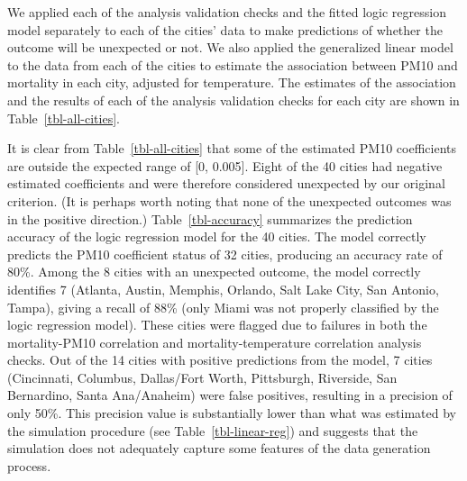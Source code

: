 \documentclass[
  12pt,
]{interact}
\begin{document}
We applied each of the analysis validation checks and the fitted logic
regression model separately to each of the cities' data to make
predictions of whether the outcome will be unexpected or not. We also
applied the generalized linear model to the data from each of the cities
to estimate the association between PM10 and mortality in each city,
adjusted for temperature. The estimates of the association and the
results of each of the analysis validation checks for each city are
shown in Table~\ref{tbl-all-cities}.

\begin{table}

\caption{\label{tbl-accuracy}Summary of the observed and the predicted
unexpected PM10 coefficient results from the 40 NMMAPS cities using the
logic regression model.}


\end{table}%

It is clear from Table~\ref{tbl-all-cities} that some of the estimated
PM10 coefficients are outside the expected range of {[}0, 0.005{]}.
Eight of the 40 cities had negative estimated coefficients and were
therefore considered unexpected by our original criterion. (It is
perhaps worth noting that none of the unexpected outcomes was in the
positive direction.) Table~\ref{tbl-accuracy} summarizes the prediction
accuracy of the logic regression model for the 40 cities. The model
correctly predicts the PM10 coefficient status of 32 cities, producing
an accuracy rate of 80\%. Among the 8 cities with an unexpected outcome,
the model correctly identifies 7 (Atlanta, Austin, Memphis, Orlando,
Salt Lake City, San Antonio, Tampa), giving a recall of 88\% (only Miami
was not properly classified by the logic regression model). These cities
were flagged due to failures in both the mortality-PM10 correlation and
mortality-temperature correlation analysis checks. Out of the 14 cities
with positive predictions from the model, 7 cities (Cincinnati,
Columbus, Dallas/Fort Worth, Pittsburgh, Riverside, San Bernardino,
Santa Ana/Anaheim) were false positives, resulting in a precision of
only 50\%. This precision value is substantially lower than what was
estimated by the simulation procedure (see Table~\ref{tbl-linear-reg})
and suggests that the simulation does not adequately capture some
features of the data generation process.
\end{document}
